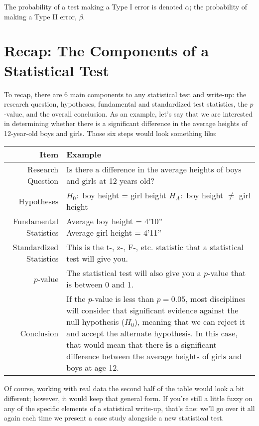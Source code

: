 The probability of a test making a Type I error is denoted $\alpha$; the probability of making a Type II error, $\beta$.

\section{Recap: The Components of a Statistical Test}

To recap, there are 6 main components to any statistical test and write-up: the research question, hypotheses, fundamental and standardized test statistics, the $p$-value, and the overall conclusion. As an example, let's say that we are interested in determining whether there is a significant difference in the average heights of 12-year-old boys and girls. Those six steps would look something like:

\begin{center}
\begin{tabular}{r l}
Item & Example \\
\hline
Research Question & Is there a difference in the average heights of boys and girls at 12 years old?\\
Hypotheses & \parbox[t]{25pc}{\(H_0:\) boy height = girl height\\\(H_A:\) boy height \(\neq\) girl height}\\
Fundamental Statistics & \parbox[t]{25pc}{Average boy height = 4'10'' \\ Average girl height = 4'11''}\\
Standardized Statistics & This is the t-, z-, F-, etc. statistic that a statistical test will give you.\\
$p$-value & The statistical test will also give you a $p$-value that is between 0 and 1.\\
Conclusion & \parbox[t]{25pc}{If the $p$-value is less than $p=0.05$, most disciplines will consider that significant evidence against the null hypothesis (\(H_0\)), meaning that we can reject it and accept the alternate hypothesis. In this case, that would mean that there \textbf{is} a significant difference between the average heights of girls and boys at age 12.}
\end{tabular}
\end{center}

Of course, working with real data the second half of the table would look a bit different; however, it would keep that general form. If you're still a little fuzzy on any of the specific elements of a statistical write-up, that's fine: we'll go over it all again each time we present a case study alongside a new statistical test.
